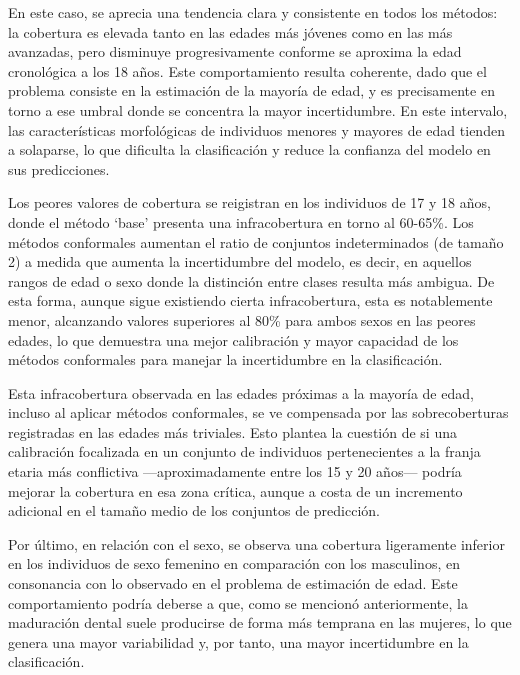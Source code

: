 En este caso, se aprecia una tendencia clara y consistente en todos los métodos: la cobertura es elevada tanto en las edades más jóvenes como en las más avanzadas, pero disminuye progresivamente conforme se aproxima la edad cronológica a los 18 años. Este comportamiento resulta coherente, dado que el problema consiste en la estimación de la mayoría de edad, y es precisamente en torno a ese umbral donde se concentra la mayor incertidumbre. En este intervalo, las características morfológicas de individuos menores y mayores de edad tienden a solaparse, lo que dificulta la clasificación y reduce la confianza del modelo en sus predicciones. 

Los peores valores de cobertura se reigistran en los individuos de 17 y 18 años, donde el método `base' presenta una infracobertura en torno al 60-65\%. Los métodos conformales aumentan el ratio de conjuntos indeterminados (de tamaño 2) a medida que aumenta la incertidumbre del modelo, es decir, en aquellos rangos de edad o sexo donde la distinción entre clases resulta más ambigua. De esta forma, aunque sigue existiendo cierta infracobertura, esta es notablemente menor, alcanzando valores superiores al 80\% para ambos sexos en las peores edades, lo que demuestra una mejor calibración y mayor capacidad de los métodos conformales para manejar la incertidumbre en la clasificación. 

Esta infracobertura observada en las edades próximas a la mayoría de edad, incluso al aplicar métodos conformales, se ve compensada por las sobrecoberturas registradas en las edades más triviales. Esto plantea la cuestión de si una calibración focalizada en un conjunto de individuos pertenecientes a la franja etaria más conflictiva ---aproximadamente entre los 15 y 20 años--- podría mejorar la cobertura en esa zona crítica, aunque a costa de un incremento adicional en el tamaño medio de los conjuntos de predicción.

Por último, en relación con el sexo, se observa una cobertura ligeramente inferior en los individuos de sexo femenino en comparación con los masculinos, en consonancia con lo observado en el problema de estimación de edad. Este comportamiento podría deberse a que, como se mencionó anteriormente, la maduración dental suele producirse de forma más temprana en las mujeres, lo que genera una mayor variabilidad y, por tanto, una mayor incertidumbre en la clasificación.

